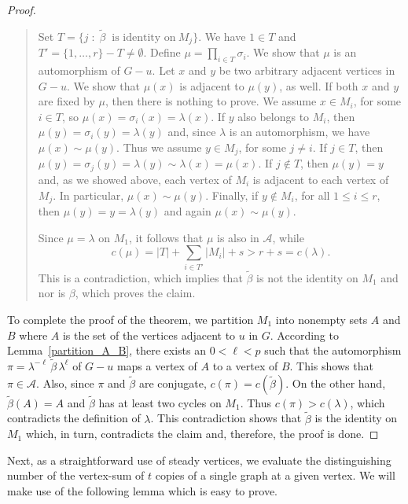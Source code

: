 \documentclass[12pt,a4paper, longbibliography]{article}
\theoremstyle{definition}
\numberwithin{equation}{section}
\begin{document}
\begin{proof}
\begin{quotation}
			Set $T=\{j \;:\;  \tilde{\beta} \; \;\text{is identity on}~ M_j\}$. We have $1\in T$ and $T'=\{1,\ldots,r\} -  T \neq \emptyset$.
			Define $ \mu =\prod_{i\in T } \sigma_i.$ We show that $\mu$ is an automorphism of $G-u.$ Let $x$ and $y$ be two arbitrary adjacent vertices in $G-u$. We show  that  $\mu (x)$ is adjacent to $\mu (y)$, as well. If both $x$ and $y$ are fixed by $\mu$, then there is nothing to prove.
			We assume $x\in M_i$, for some $i\in T$, so $\mu(x)=\sigma_i(x)=\lambda(x)$. If $y$ also belongs to $M_i$, then $\mu(y)=\sigma_i(y)=\lambda(y)$ and, since $\lambda$ is an automorphism, we have $\mu(x)\sim \mu(y)$. Thus we assume  $y\in M_j$, for some $j\neq i$.  If $j\in T$, then $\mu(y)=\sigma_j(y)=\lambda(y) \sim \lambda(x)=\mu(x).$  If $j \notin T$, then $\mu(y)=y$ and, as we showed above, each vertex of $M_i$ is adjacent to each vertex of $M_j$.  In particular, $\mu(x)\sim \mu(y)$. Finally,
			if $y\notin M_i$, for all $1\leq i\leq r$, then $\mu(y)=y=\lambda(y)$ and again $\mu(x)\sim \mu(y)$.
			
			Since $\mu=\lambda$ on $M_1$, it follows that $\mu$ is also in $\mathcal{A}$, while 
			\[
			c(\mu)=|T|+\sum_{i\in T'}|M_i|+s>r+s=c(\lambda).
			\]
			This is a contradiction, which implies that $\tilde{\beta}$ is not the identity on $M_1$ and nor is $\beta$, which proves the claim.   
		\end{quotation}

		To complete the proof of the theorem, we partition $M_1$ into nonempty sets $A$ and $B$ where $A$ is the set of the vertices adjacent to $u$ in $G$.    
		According to Lemma~\ref{partition_A_B}, there exists an  $0<\ell<p$ such that the automorphism $\pi=\lambda^{-\ell} \, \tilde{\beta} \,\lambda^{\ell}$ of $G-u$ maps a vertex of $A$ to a vertex of $B$. This shows that $\pi\in \mathcal{A}.$ Also, since $\pi$ and $\tilde{\beta}$ are conjugate, $c(\pi)=c(\tilde{\beta})$. On the other hand,  $\tilde{\beta}(A)=A$ and $\tilde{\beta}$ has at least two cycles on  $M_1$.  Thus $c(\pi)>c(\lambda)$, which contradicts the definition of $\lambda$. This contradiction shows that $\tilde{\beta}$ is the identity on $M_1$ which, in turn, contradicts the claim and, therefore, the proof is done.
	\end{proof}
	
	
	Next, as   a straightforward use of steady vertices, we evaluate the distinguishing number of the vertex-sum of $t$ copies of a single graph at a given vertex. We will make use of the   following lemma which is easy to prove.
	
\end{document}
